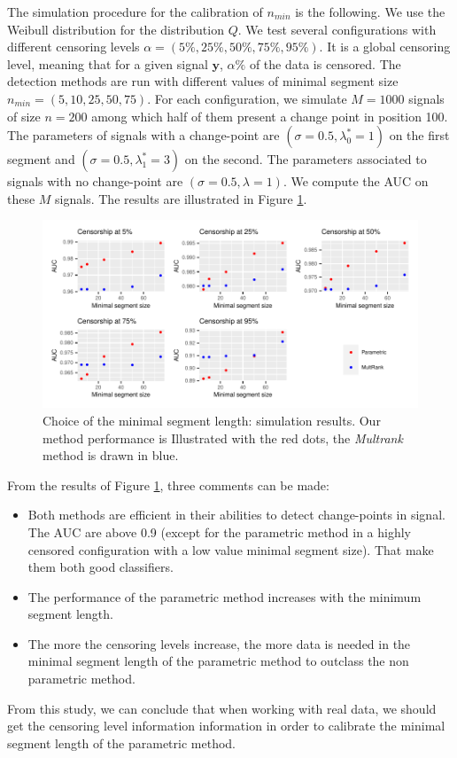 The simulation procedure for the calibration of $n_{min}$ is the following. We use the Weibull distribution for the distribution $Q$. We test several configurations with different censoring levels $\alpha = (5\%,25\%,50\%,75\%,95\%)$. It is a global censoring level, meaning that for a given signal $\bm y$, $\alpha\%$ of the data is censored. The detection methods are run with different values of minimal segment size $n_{min} = (5,10,25,50,75)$. For each configuration, we simulate $M = 1000$ signals of size $n = 200$ among which half of them present a change point in position 100. The parameters of signals with a change-point are $(\sigma = 0.5,\lambda^*_0 = 1)$ on the first segment and $(\sigma = 0.5,\lambda^*_1 = 3)$ on the second. The parameters associated to signals with no change-point are $(\sigma = 0.5,\lambda = 1)$. We compute the AUC on these $M$ signals. The results are illustrated in Figure \ref{fig:sim_minseg}.      

\begin{figure}[ht]
\centering
\includegraphics{figs/Chap4/sim_minseg.pdf}
\caption{Choice of the minimal segment length: simulation results. Our method performance is Illustrated with the red dots, the \textit{Multrank} method is drawn in blue.}
\label{fig:sim_minseg}
\end{figure}

From the results of Figure \ref{fig:sim_minseg}, three comments can be made:  
\begin{itemize}
\item Both methods are efficient in their abilities to detect change-points in signal. The AUC are above 0.9 (except for the parametric method in a highly censored configuration with a low value minimal segment size). That make them both good classifiers. 
\item The performance of the parametric method increases with the minimum segment length. 
\item The more the censoring levels increase, the more data is needed in the minimal segment length of the parametric method to outclass the non parametric method. 
\end{itemize}
From this study, we can conclude that when working with real data, we should get the censoring level information information in order to calibrate the minimal segment length of the parametric method.  

